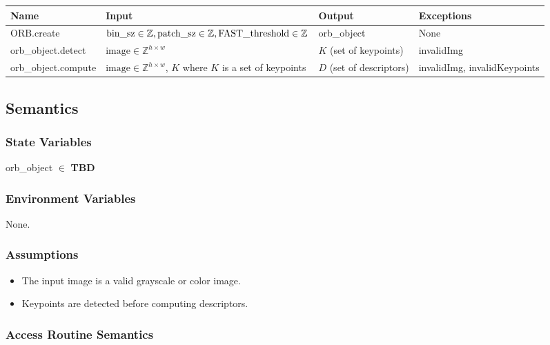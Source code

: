 \documentclass[12pt, titlepage]{article}
\begin{document}
\begin{center}
\begin{tabular}{p{3.5cm} p{6cm} p{4.5cm} p{2cm}}
\hline
\textbf{Name} & \textbf{Input} & \textbf{Output} & \textbf{Exceptions} \\
\hline
ORB.create & $\text{bin\_sz}\in \mathbb{Z}, \newline 
\text{patch\_sz}\in \mathbb{Z}, \newline 
\text{FAST\_threshold} \in \mathbb{Z}$ & orb\_object & None \\
\hline
orb\_object.detect & $\text{image} \in \mathbb{Z}^{h \times w}$ & $K$ (set of keypoints) & invalidImg \\
\hline
orb\_object.compute & $\text{image} \in \mathbb{Z}^{h \times w}$, \newline 
$K$ where $K$ is a set of keypoints & $D$ (set of descriptors) & invalidImg, invalidKeypoints \\
\hline
\end{tabular}
\end{center}

\subsection{Semantics}

\subsubsection{State Variables}
orb\_object $\in$ \textbf{TBD}

\subsubsection{Environment Variables}
None.

\subsubsection{Assumptions}
\begin{itemize}
    \item The input image is a valid grayscale or color image.
    \item Keypoints are detected before computing descriptors.
\end{itemize}

\subsubsection{Access Routine Semantics}
\end{document}

